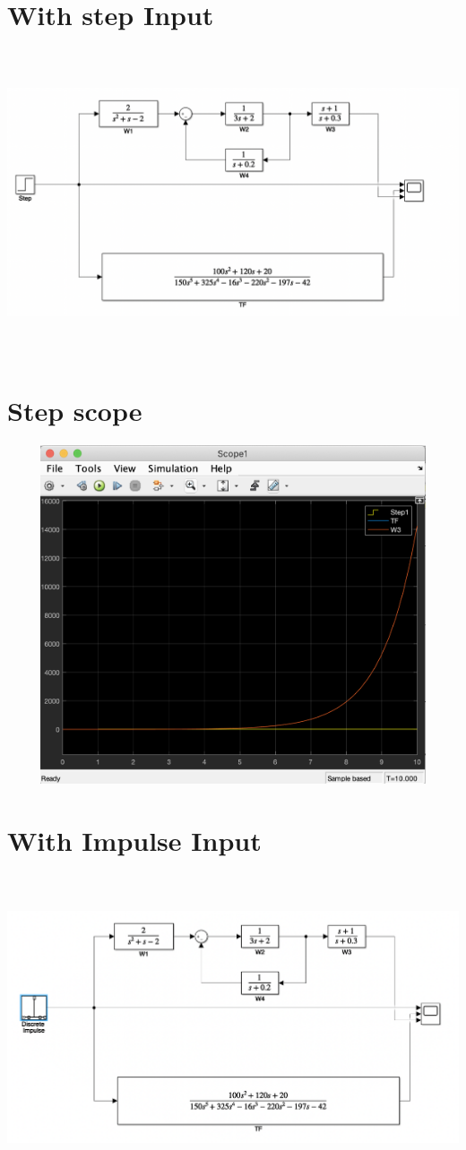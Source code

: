 \documentclass[a4paper,11pt]{article}
\theoremstyle{mytheor}
\begin{document}
\section*{With step Input}
\includegraphics[width=15cm, height=9cm]{step_1.png}
\section*{Step scope}
\includegraphics[width=15cm, height=10cm]{step_2.png}
\section*{With Impulse Input}
\includegraphics[width=15cm, height=9cm]{impulse_1.png}
\end{document}

